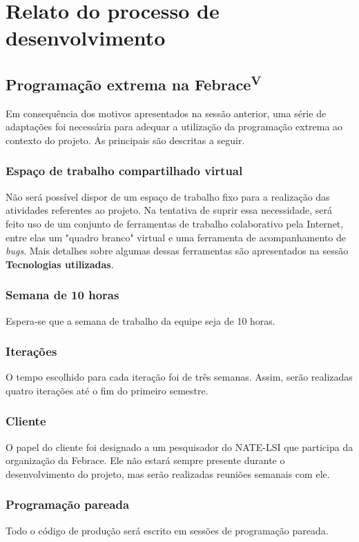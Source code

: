 \section{Relato do processo de desenvolvimento}

	\subsection{Programação extrema na Febrace\textsuperscript{V}}
    Em consequência dos motivos apresentados na sessão anterior, uma série de adaptações foi necessária para adequar a utilização da programação extrema ao contexto do projeto. As principais são descritas a seguir.

    \subsubsection{Espaço de trabalho compartilhado virtual}
      Não será possível dispor de um espaço de trabalho fixo para a realização das atividades referentes ao projeto. Na tentativa de suprir essa necessidade, será feito uso de um conjunto de ferramentas de trabalho colaborativo pela Internet, entre elas um "quadro branco" virtual e uma ferramenta de acompanhamento de \textit{bugs}. Mais detalhes sobre algumas dessas ferramentas são apresentados na sessão \textbf{Tecnologias utilizadas}.

    \subsubsection{Semana de 10 horas}
      Espera-se que a semana de trabalho da equipe seja de 10 horas.

    \subsubsection{Iterações}
      O tempo escolhido para cada iteração foi de três semanas. Assim, serão realizadas quatro iterações até o fim do primeiro semestre.

    \subsubsection{Cliente}
      O papel do cliente foi designado a um pesquisador do NATE-LSI que participa da organização da Febrace. Ele não estará sempre presente durante o desenvolvimento do projeto, mas serão realizadas reuniões semanais com ele.

    \subsubsection{Programação pareada}
      Todo o código de produção será escrito em sessões de programação pareada.

